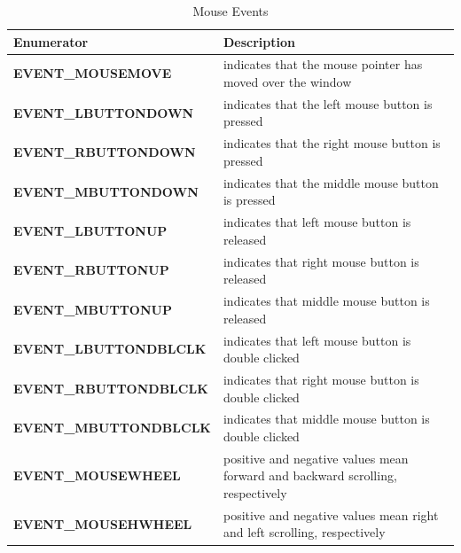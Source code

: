\documentclass{article}
\theoremstyle{definition}
\theoremstyle{remark}
\begin{document}
\begin{table}[h!]
    \centering
    \def\arraystretch{1.1}%
    \begin{tabular}{ p{5cm} p{7cm} } 
	\hline
	Enumerator & Description \\
	\hline
	\textbf{\footnotesize{EVENT\_MOUSEMOVE}} & indicates that the mouse pointer has moved over the window \\
	
	\textbf{\footnotesize{EVENT\_LBUTTONDOWN}} & indicates that the left mouse button is pressed \\
	
	\textbf{\footnotesize{EVENT\_RBUTTONDOWN}} & indicates that the right mouse button is pressed \\
	
	\textbf{\footnotesize{EVENT\_MBUTTONDOWN}} & indicates that the middle mouse button is pressed \\
	
	\textbf{\footnotesize{EVENT\_LBUTTONUP}} & indicates that left mouse button is released \\
	
	\textbf{\footnotesize{EVENT\_RBUTTONUP}} & indicates that right mouse button is released \\
	
	\textbf{\footnotesize{EVENT\_MBUTTONUP}} & indicates that middle mouse button is released \\
    
	\textbf{\footnotesize{EVENT\_LBUTTONDBLCLK}} & indicates that left mouse button is double clicked \\
	
	\textbf{\footnotesize{EVENT\_RBUTTONDBLCLK}} & indicates that right mouse button is double clicked \\
	
	\textbf{\footnotesize{EVENT\_MBUTTONDBLCLK}} & indicates that middle mouse button is double clicked \\
	
	\textbf{\footnotesize{EVENT\_MOUSEWHEEL}} & positive and negative values mean forward and backward scrolling, respectively \\
	
	\textbf{\footnotesize{EVENT\_MOUSEHWHEEL}} & positive and negative values mean right and left scrolling, respectively \\
	\hline
    \end{tabular}
    \caption{Mouse Events}
    \label{table:mouse_events}
\end{table}
\end{document}
